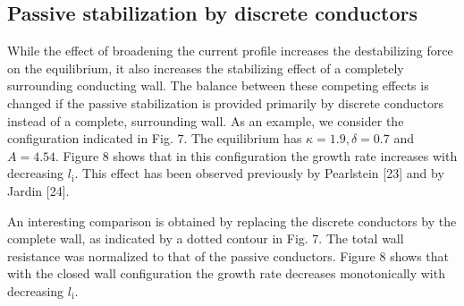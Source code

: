 \documentclass[utf8]{ctexart}
\begin{document}
\begin{sloppypar}
  
 \subsection{Passive stabilization by discrete conductors}
 While the effect of broadening the current profile increases the destabilizing force on the equilibrium, it also increases the stabilizing effect of a completely surrounding conducting wall. The balance between these competing effects is changed if the passive stabilization is provided primarily by discrete conductors instead of a complete, surrounding wall. As an example, we consider the configuration indicated in Fig. 7. The equilibrium has $\kappa=1.9, \delta=0.7$ and $A=4.54$. Figure 8 shows that in this configuration the growth rate increases with decreasing $l_{\mathrm{i}}$. This effect has been observed previously by Pearlstein [23] and by Jardin [24].
 
 An interesting comparison is obtained by replacing the discrete conductors by the complete wall, as indicated by a dotted contour in Fig. 7. The total wall resistance was normalized to that of the passive conductors. Figure 8 shows that with the closed wall configuration the growth rate decreases monotonically with decreasing $l_{\mathrm{i}}$.
 

\end{sloppypar}
\end{document}
